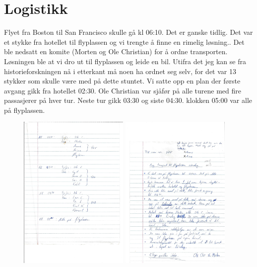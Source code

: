 \documentclass[../../main.tex]{subfiles}
\begin{document}
\section{Logistikk}

Flyet fra Boston til San Francisco skulle gå kl 06:10. Det er ganske tidlig. Det var et stykke fra hotellet til flyplassen og vi trengte å finne en rimelig løsning.. Det ble nedsatt en komite (Morten og Ole Christian) for å ordne transporten. Løsningen ble at vi dro ut til flyplassen og leide en bil. Utifra det jeg kan se fra historieforskningen nå i etterkant må noen ha ordnet seg selv, for det var 13 stykker som skulle være med på dette stuntet. Vi satte opp en plan der første avgang gikk fra hotellet 02:30. Ole Christian var sjåfør på alle turene med fire passasjerer på hver tur. Neste tur gikk 03:30 og siste 04:30. klokken 05:00 var alle på flyplassen.

\begin{figure}
	\includegraphics[width=200px]{images/usa88/kjoring2.jpg}
	\includegraphics[width=200px]{images/usa88/kjoring1.jpg}
\end{figure}
\end{document}
